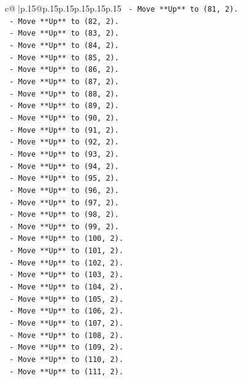 \documentclass{article}
\begin{document}
{\begin{supertabular}{c@{$\;$}|p{.15\linewidth}@{}p{.15\linewidth}p{.15\linewidth}p{.15\linewidth}p{.15\linewidth}p{.15\linewidth}}
{{{\texttt{    {-} Move **Up** to (81, 2).} \\
\texttt{    {-} Move **Up** to (82, 2).} \\
\texttt{    {-} Move **Up** to (83, 2).} \\
\texttt{    {-} Move **Up** to (84, 2).} \\
\texttt{    {-} Move **Up** to (85, 2).} \\
\texttt{    {-} Move **Up** to (86, 2).} \\
\texttt{    {-} Move **Up** to (87, 2).} \\
\texttt{    {-} Move **Up** to (88, 2).} \\
\texttt{    {-} Move **Up** to (89, 2).} \\
\texttt{    {-} Move **Up** to (90, 2).} \\
\texttt{    {-} Move **Up** to (91, 2).} \\
\texttt{    {-} Move **Up** to (92, 2).} \\
\texttt{    {-} Move **Up** to (93, 2).} \\
\texttt{    {-} Move **Up** to (94, 2).} \\
\texttt{    {-} Move **Up** to (95, 2).} \\
\texttt{    {-} Move **Up** to (96, 2).} \\
\texttt{    {-} Move **Up** to (97, 2).} \\
\texttt{    {-} Move **Up** to (98, 2).} \\
\texttt{    {-} Move **Up** to (99, 2).} \\
\texttt{    {-} Move **Up** to (100, 2).} \\
\texttt{    {-} Move **Up** to (101, 2).} \\
\texttt{    {-} Move **Up** to (102, 2).} \\
\texttt{    {-} Move **Up** to (103, 2).} \\
\texttt{    {-} Move **Up** to (104, 2).} \\
\texttt{    {-} Move **Up** to (105, 2).} \\
\texttt{    {-} Move **Up** to (106, 2).} \\
\texttt{    {-} Move **Up** to (107, 2).} \\
\texttt{    {-} Move **Up** to (108, 2).} \\
\texttt{    {-} Move **Up** to (109, 2).} \\
\texttt{    {-} Move **Up** to (110, 2).} \\
\texttt{    {-} Move **Up** to (111, 2).} \\
}}}
\end{supertabular}}
\end{document}
